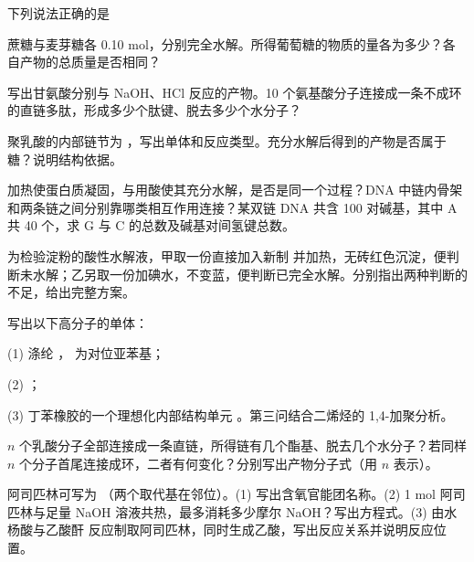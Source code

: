 \begin{xiti}[start=1]
\item {} 下列说法正确的是\xz
{}
\item {} 蔗糖与麦芽糖各 0.10 mol，分别完全水解。所得葡萄糖的物质的量各为多少？各自产物的总质量是否相同？
\item {} 写出甘氨酸分别与 NaOH、HCl 反应的产物。10 个氨基酸分子连接成一条不成环的直链多肽，形成多少个肽键、脱去多少个水分子？
\item {} 聚乳酸的内部链节为 ，写出单体和反应类型。充分水解后得到的产物是否属于糖？说明结构依据。
\item {} 加热使蛋白质凝固，与用酸使其充分水解，是否是同一个过程？DNA 中链内骨架和两条链之间分别靠哪类相互作用连接？某双链 DNA 共含 100 对碱基，其中 A 共 40 个，求 G 与 C 的总数及碱基对间氢键总数。
\end{xiti}

\begin{xiti}
\item {} 为检验淀粉的酸性水解液，甲取一份直接加入新制  并加热，无砖红色沉淀，便判断未水解；乙另取一份加碘水，不变蓝，便判断已完全水解。分别指出两种判断的不足，给出完整方案。
\item {} 写出以下高分子的单体：\par (1) 涤纶 ， 为对位亚苯基；\par (2) ；\par (3) 丁苯橡胶的一个理想化内部结构单元 。第三问结合二烯烃的 1,4-加聚分析。
\item {} $n$ 个乳酸分子全部连接成一条直链，所得链有几个酯基、脱去几个水分子？若同样 $n$ 个分子首尾连接成环，二者有何变化？分别写出产物分子式（用 $n$ 表示）。
\item {} 阿司匹林可写为 （两个取代基在邻位）。(1) 写出含氧官能团名称。(2) 1 mol 阿司匹林与足量 NaOH 溶液共热，最多消耗多少摩尔 NaOH？写出方程式。(3) 由水杨酸与乙酸酐  反应制取阿司匹林，同时生成乙酸，写出反应关系并说明反应位置。
\end{xiti}


